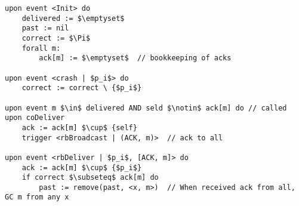 \begin{lstlisting}[caption={Garbage Collected Causal Order Broadcast}, mathescape]
upon event <Init> do
    delivered := $\emptyset$
    past := nil
    correct := $\Pi$
    forall m:
        ack[m] := $\emptyset$  // bookkeeping of acks

upon event <crash | $p_i$> do
    correct := correct \ {$p_i$}

upon event m $\in$ delivered AND seld $\notin$ ack[m] do // called upon coDeliver
    ack := ack[m] $\cup$ {self}
    trigger <rbBroadcast | (ACK, m)>  // ack to all

upon event <rbDeliver | $p_i$, [ACK, m]> do
    ack := ack[m] $\cup$ {$p_i$}
    if correct $\subseteq$ ack[m] do
        past := remove(past, <x, m>)  // When received ack from all, GC m from any x
\end{lstlisting}
